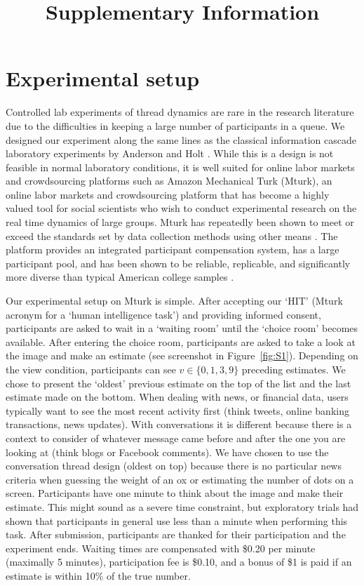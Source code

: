 \documentclass[9pt,a4paper,twocolumn,lineno]{article}
\begin{document}
\title{\Huge \center Supplementary Information}


\section*{Experimental setup}
Controlled lab experiments of thread dynamics are rare in the research literature due to the difficulties in keeping a large number of participants in a queue. We designed our experiment along the same lines as the classical information cascade laboratory experiments by Anderson and Holt \cite{anderson1997information}. While this is a design is not feasible in normal laboratory conditions, it is well suited for online labor markets and crowdsourcing platforms such as Amazon Mechanical Turk (Mturk), an online labor markets and crowdsourcing platform that has become a highly valued tool for social scientists who wish to conduct experimental research on the real time dynamics of large groups. Mturk has repeatedly been shown to meet or exceed the standards set by data collection methods using other means \cite{berinsky2012evaluating, buhrmester2018evaluation}. The platform provides an integrated participant compensation system, has a large participant pool, and has been shown to be reliable, replicable, and significantly more diverse than typical American college samples \cite{mason2009financial, buhrmester2011amazon, crump2013evaluating, rand2012promise, horton2011online}.

Our experimental setup on Mturk is simple. After accepting our ‘HIT’ (Mturk acronym for a ‘human intelligence task’) and providing informed consent, participants are asked to wait in a ‘waiting room’ until the ‘choice room’ becomes available. After entering the choice room, participants are asked to take a look at the image and make an estimate (see screenshot in Figure~\ref{fig:S1}). Depending on the view condition, participants can see $v\in\{0,1,3,9\}$ preceding estimates. We chose to present the ‘oldest’ previous estimate on the top of the list and the last estimate made on the bottom. When dealing with news, or financial data, users typically want to see the most recent activity first (think tweets, online banking transactions, news updates). With conversations it is different because there is a context to consider of whatever message came before and after the one you are looking at (think blogs or Facebook comments). We have chosen to use the conversation thread design (oldest on top) because there is no particular news criteria when guessing the weight of an ox or estimating the number of dots on a screen. Participants have one minute to think about the image and make their estimate. This might sound as a severe time constraint, but exploratory trials had shown that participants in general use less than a minute when performing this task. After submission, participants are thanked for their participation and the experiment ends. Waiting times are compensated with \$0.20 per minute (maximally 5 minutes), participation fee is \$0.10, and a bonus of \$1 is paid if an estimate is within 10\% of the true number.
\end{document}
